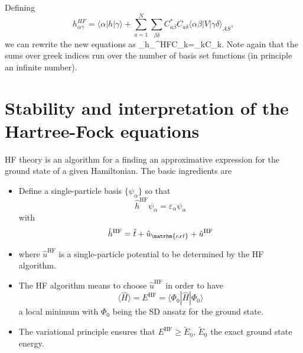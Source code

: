 Defining 
\[
h_{\alpha\gamma}^{HF}=\langle \alpha | h | \gamma \rangle+
\sum_{a=1}^N\sum_{\beta\delta} C^*_{a\beta}C_{a\delta}\langle \alpha\beta|V|\gamma\delta\rangle_{AS},
\]
we can rewrite the new equations as 
\be
\sum_{\gamma}h_{\alpha\gamma}^{HF}C_{k\gamma}=\epsilon_kC_{k\alpha}.
\label{eq:newhf}
\ee
Note again that the sums over greek indices run over the number of basis set functions (in principle an infinite number).

\section{Stability and interpretation of the Hartree-Fock equations}
HF theory is an algorithm for a finding an approximative expression for the ground state of a given
Hamiltonian. The basic ingredients are
\begin{itemize}
\item Define a single-particle basis $\{\psi_{\alpha}\}$ so that
\[ \hat{h}^{\mathrm{HF}}\psi_{\alpha} = \varepsilon_{\alpha}\psi_{\alpha}\]
with \[\hat{h}^{\mathrm{HF}}=\hat{t}+\hat{u}_{\matrhm{ext}}+\hat{u}^{\mathrm{HF}}\]
\item where $\hat{u}^{\mathrm{HF}}$ is a single-particle potential to be determined by the HF algorithm.
\item The HF algorithm means to choose $\hat{u}^{\mathrm{HF}}$ in order to have 
\[ \langle \hat{H} \rangle = E^{\mathrm{HF}}= \langle \Phi_0 | \hat{H}|\Phi_0 \rangle\]
a local minimum with $\Phi_0$ being the SD ansatz for the ground state. 
\item The variational principle ensures that $E^{\mathrm{HF}} \ge \tilde{E}_0$, $\tilde{E}_0$ the exact ground state energy.
\end{itemize}

